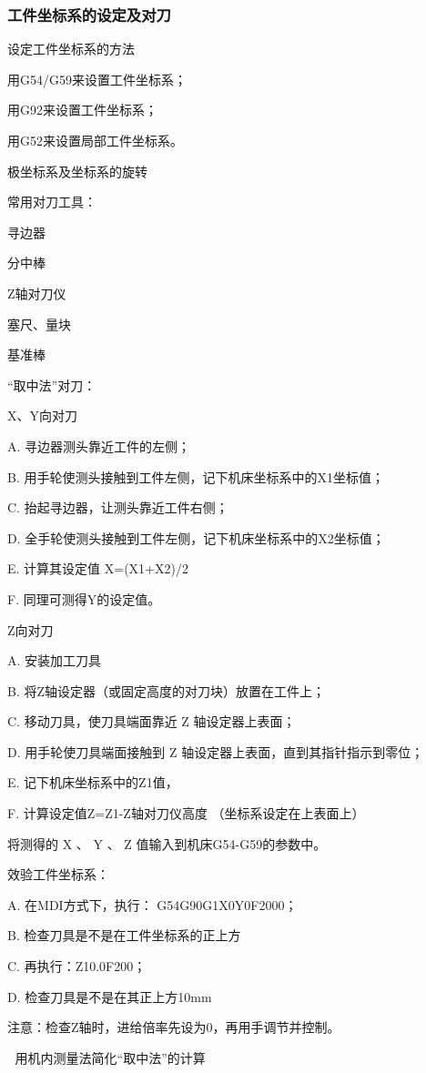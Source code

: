 \subsubsection{工件坐标系的设定及对刀}
设定工件坐标系的方法

用G54/G59来设置工件坐标系；

用G92来设置工件坐标系；

用G52来设置局部工件坐标系。

极坐标系及坐标系的旋转

常用对刀工具：

寻边器

分中棒

Z轴对刀仪

塞尺、量块

基准棒

“取中法”对刀：

X、Y向对刀 

A.	寻边器测头靠近工件的左侧； 


B.	用手轮使测头接触到工件左侧，记下机床坐标系中的X1坐标值； 

C.	抬起寻边器，让测头靠近工件右侧； 

D.	全手轮使测头接触到工件左侧，记下机床坐标系中的X2坐标值； 

E.	计算其设定值 X=(X1+X2)/2 

F.	同理可测得Y的设定值。

Z向对刀 

A.	安装加工刀具

B.	将Z轴设定器（或固定高度的对刀块）放置在工件上； 

C.	移动刀具，使刀具端面靠近 Z 轴设定器上表面； 

D.	用手轮使刀具端面接触到 Z 轴设定器上表面，直到其指针指示到零位； 

E.	记下机床坐标系中的Z1值，

F.	计算设定值Z=Z1-Z轴对刀仪高度      （坐标系设定在上表面上）

将测得的 X 、 Y 、 Z 值输入到机床G54-G59的参数中。

效验工件坐标系：

A.	在MDI方式下，执行： G54G90G1X0Y0F2000；

B.	检查刀具是不是在工件坐标系的正上方

C.	再执行：Z10.0F200；

D.	检查刀具是不是在其正上方10mm

注意：检查Z轴时，进给倍率先设为0，再用手调节并控制。

	用机内测量法简化“取中法”的计算


